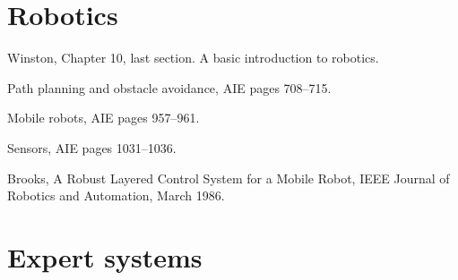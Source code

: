 \section{Robotics}
\label{sec:robotics}

\begin{required}

\paper Winston, Chapter 10, last section.  A basic introduction to
robotics.

\paper Path planning and obstacle avoidance, AIE pages 708--715.
  
\paper Mobile robots, AIE pages 957--961.

\paper Sensors, AIE pages 1031--1036.

\end{required}

\begin{optional}

\paper Brooks, A Robust Layered Control System for a Mobile Robot,
IEEE Journal of Robotics and Automation, March 1986.

\end{optional}

\section{Expert systems}
\label{sec:expert-systems}

